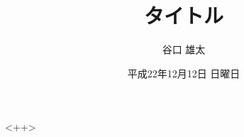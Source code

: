 \documentclass[a4j]{jsarticle}
\title{タイトル}
\author{谷口 雄太}
\date{平成22年12月12日 日曜日}
\begin{document}
\maketitle


<++>
\end{document}
